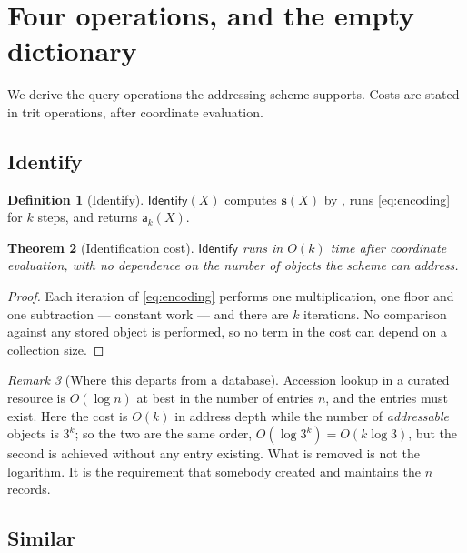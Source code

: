 \documentclass[11pt,twocolumn,a4paper]{article}
\theoremstyle{thmstyle}
\newtheorem{theorem}{Theorem}[section]
\theoremstyle{definition}
\newtheorem{definition}[theorem]{Definition}
\theoremstyle{remark}
\newtheorem{remark}[theorem]{Remark}
\newcommand{\addr}{\mathsf{a}}
\begin{document}
\section{Four operations, and the empty dictionary}
\label{sec:operations}

We derive the query operations the addressing scheme supports. Costs
are stated in trit operations, after coordinate evaluation.

\subsection{Identify}

\begin{definition}[Identify]
\label{def:identify}
$\textsf{Identify}(X)$ computes $\mathbf{s}(X)$ by
, runs \eqref{eq:encoding} for $k$ steps, and
returns $\addr_k(X)$.
\end{definition}

\begin{theorem}[Identification cost]
\label{thm:identify}
$\textsf{Identify}$ runs in $O(k)$ time after coordinate evaluation,
with no dependence on the number of objects the scheme can address.
\end{theorem}

\begin{proof}
Each iteration of \eqref{eq:encoding} performs one multiplication, one
floor and one subtraction --- constant work --- and there are $k$
iterations. No comparison against any stored object is performed, so no
term in the cost can depend on a collection size.
\end{proof}

\begin{remark}[Where this departs from a database]
\label{rem:identify-vs-db}
Accession lookup in a curated resource \citep{uniprot2023,burley2023}
is $O(\log n)$ at best in the number of entries $n$, and the entries
must exist. Here the cost is $O(k)$ in address depth while the number
of \emph{addressable} objects is $3^k$; so the two are the same order,
$O(\log 3^k) = O(k\log 3)$, but the second is achieved without any
entry existing. What is removed is not the logarithm. It is the
requirement that somebody created and maintains the $n$ records.
\end{remark}

\subsection{Similar}
\end{document}
